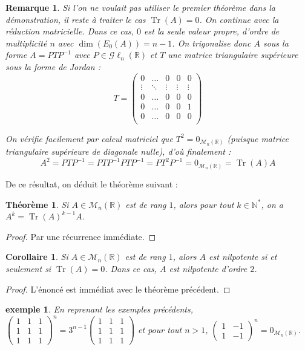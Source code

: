 \documentclass[a4paper]{article}
\newtheorem*{theorem}{Théorème}
\newtheorem*{remark}{Remarque}
\newtheorem*{example}{exemple}
\newtheorem*{cor}{Corollaire}
\begin{document}
\begin{remark}
    Si l'on ne voulait pas utiliser le premier théorème dans la démonstration, il reste à traiter le cas $\operatorname{Tr}(A) = 0$. On continue avec la réduction matricielle. Dans ce cas, $0$ est la seule valeur propre, d'ordre de multiplicité $n$ avec $\dim(E_0(A))=n-1$. On trigonalise donc $A$ sous la forme $A = PTP^{-1}$ avec $P \in \mathcal{G}\ell_n(\mathbb{R})$ et $T$ une matrice triangulaire supérieure sous la forme de Jordan :
    $$ T = \begin{pmatrix}
        0 & \dots & 0 & 0 & 0 \\
        \vdots  & \ddots & \vdots & \vdots & \vdots \\
        0 & \dots & 0 & 0 & 0 \\
        0 & \dots & 0 & 0 & 1 \\
        0 & \dots & 0 & 0 & 0 \\
    \end{pmatrix}$$
    
    On vérifie facilement par calcul matriciel que $T^2 = 0_{\mathcal{M}_{n}(\mathbb{R})}$ (puisque matrice triangulaire supérieure de diagonale nulle), d'où finalement : $$A^2 = PTP^{-1} = PTP^{-1}PTP^{-1} = PT^2P^{-1} = 0_{\mathcal{M}_{n}(\mathbb{R})} = \operatorname{Tr}(A)A$$
\end{remark}

De ce résultat, on déduit le théorème suivant :

\begin{theorem}
    Si $A \in \mathcal{M}_{n}(\mathbb{R})$ est de rang $1$, alors pour tout $k \in \mathbb{N}^*$, on a $A^k = \operatorname{Tr}(A)^{k-1}A$.
\end{theorem}

\begin{proof}
    Par une récurrence immédiate.
\end{proof}

\begin{cor}
    Si $A \in \mathcal{M}_{n}(\mathbb{R})$ est de rang $1$, alors $A$ est nilpotente si et seulement si $\operatorname{Tr}(A) = 0$. Dans ce cas, $A$ est nilpotente d'ordre $2$.
\end{cor}

\begin{proof}
    L'énoncé est immédiat avec le théorème précédent.
\end{proof}

\begin{example}
    En reprenant les exemples précédents, $\begin{pmatrix} 1 & 1 & 1 \\ 1 & 1 & 1 \\ 1 & 1 & 1 \end{pmatrix} ^n = 3^{n-1} \begin{pmatrix} 1 & 1 & 1 \\ 1 & 1 & 1 \\ 1 & 1 & 1 \end{pmatrix}$ et pour tout $n > 1$, $\begin{pmatrix}1 & -1 \\ 1 & -1\end{pmatrix}^n = 0_{\mathcal{M}_{n}(\mathbb{R})}$.
\end{example}
\end{document}
